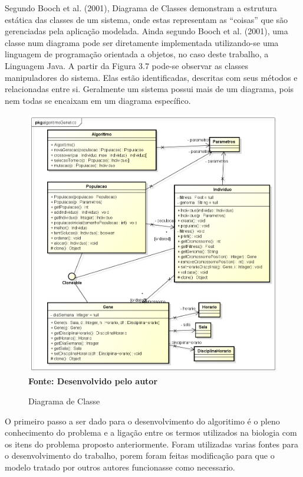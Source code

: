\documentclass{abntpuc}
\begin{document}
Segundo Booch et al. (2001), Diagrama de Classes demonstram a estrutura estática
das classes de um sistema, onde estas representam as “coisas” que são gerenciadas pela
aplicação modelada. Ainda segundo Booch et al. (2001), uma classe num diagrama pode
ser diretamente implementada utilizando-se uma linguagem de programação orientada a
objetos, no caso deste trabalho, a Linguagem Java.
A partir da Figura 3.7 pode-se observar as classes manipuladores do sistema. Elas
estão identificadas, descritas com seus métodos e relacionadas entre si. Geralmente um
sistema possui mais de um diagrama, pois nem todas se encaixam em um diagrama
específico.

\begin{figure}[!htb]
\caption[Diagrama de Classe]{Diagrama de Classe}
\label{fig:figura3}
\centering
\includegraphics[scale=0.6]{imagens/diagramaClasse.png}
\\ \textbf{\footnotesize Fonte: Desenvolvido pelo autor}
\end{figure}



O primeiro passo a ser dado para o desenvolvimento do algoritimo é o pleno conhecimento do problema e a ligação entre os termos utilizados na biologia com os itens do problema proposto anteriormente. Foram utilizadas varias fontes para o desenvolvimento do trabalho, porem foram feitas modificação para que o modelo tratado por outros autores funcionasse como necessario.\par
\end{document}
